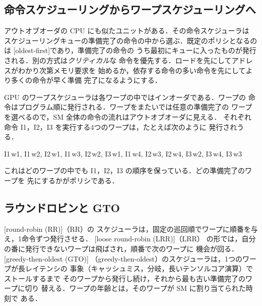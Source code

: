 \documentclass[../main.tex]{subfiles}
\begin{document}
%
\subsection{命令スケジューリングからワープスケジューリングへ}

アウトオブオーダの CPU にも似たユニットがある．その命令スケジューラは
スケジューリングキューの準備完了の命令の中から選ぶ．既定のポリシとなるのは
[oldest-first]であり，準備完了の命令の
うち最初にキューに入ったものが発行される．別の方式は\emph{クリティカル}な
命令を優先する．ロードを先にしてアドレスがわかり次第メモリ要求を
始めるか，依存する命令の多い命令を先にしてより多くの命令が早く準備
完了になるようにする．

GPU のワープスケジューラは各ワープの中ではインオーダである．ワープの
命令はプログラム順に発行される．ワープをまたいでは任意の準備完了の
ワープを選べるので，SM 全体の命令の流れはアウトオブオーダに見える．
それぞれ命令 I1，I2，I3 を実行する4つのワープは，たとえば次のように
発行されうる．
\begin{center}
  \small
  I1\,w1, I1\,w2, I2\,w1, I1\,w3, I2\,w2, I3\,w1, I1\,w4, I2\,w3,
  I2\,w4, I3\,w2, I3\,w4, I3\,w3
\end{center}
これはどのワープの中でも I1，I2，I3 の順序を保っている．どの準備完了のワープを
先にするかがポリシである．

\subsection{ラウンドロビンと GTO}

\begin{definition}
  \label{def:l07-rr-gto}
  [round-robin (RR)]（RR）の
  スケジューラは，固定の巡回順でワープに順番を与え，1命令ずつ発行させる．
  [loose round-robin (LRR)]（LRR）
  の形では，自分の番に発行できないワープは飛ばされ，順番で次のワープに
  機会が回る．
  [greedy-then-oldest (GTO)]
  （greedy-then-oldest）のスケジューラは，1つのワープが長レイテンシの
  事象（キャッシュミス，分岐，長いテンソルコア演算）でストールするまで
  そのワープから発行し続け，それから最も古い準備完了のワープに切り
  替える．ワープの年齢とは，そのワープが SM に割り当てられた時刻で
  ある．
\end{definition}
\end{document}
